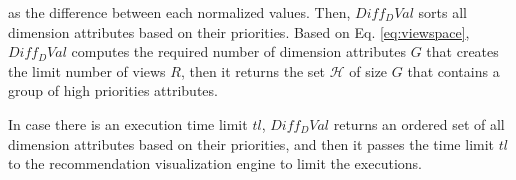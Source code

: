 as the difference between each normalized values. 
%
Then, $Diff_DVal$ sorts all dimension attributes based on their priorities.
%
Based on Eq. \ref{eq:viewspace}, $Diff_DVal$ computes the required number of dimension attributes $G$ that creates the limit number of views $R$, then it returns the set $\mathcal{H}$  of size $G$ that contains a group of high priorities attributes.

In case there is an execution time limit $tl$, $Diff_DVal$ returns an ordered set of all dimension attributes based on their priorities, and then it passes the time limit $tl$ to the recommendation visualization engine to limit the executions.
 


